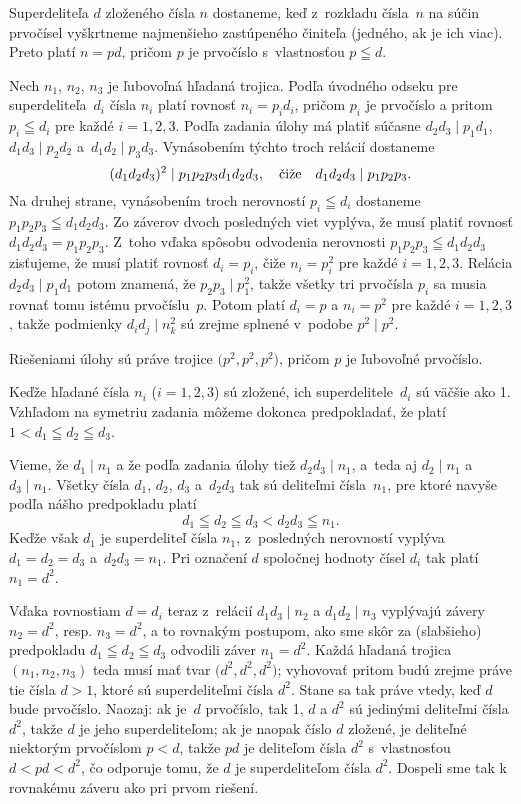 {%
Superdeliteľa $d$ zloženého čísla $n$ dostaneme,
keď z~rozkladu čísla~$n$ na súčin prvočísel vyškrtneme najmenšieho
zastúpeného činiteľa (jedného, ak je ich viac).
Preto platí $n=pd$, pričom $p$ je prvočíslo
s~vlastnosťou $p\leqq d$.

Nech $n_1$, $n_2$, $n_3$ je ľubovoľná hľadaná trojica. Podľa úvodného odseku pre superdeliteľa~$d_i$ čísla $n_i$ platí
rovnosť $n_i=p_id_i$, pričom $p_i$ je prvočíslo a pritom $p_i\leqq d_i$
pre každé $i=1,2,3$. Podľa zadania
úlohy má platiť súčasne $d_2d_3\mid p_1d_1$, $d_1d_3\mid p_2d_2$ a~$d_1d_2\mid p_3d_3$. Vynásobením týchto troch relácií dostaneme
$$
(d_1d_2d_3)^2\mid p_1p_2p_3d_1d_2d_3,\quad\hbox{čiže}\quad
d_1d_2d_3\mid p_1p_2p_3.
$$
Na druhej strane, vynásobením troch nerovností $p_i\leqq d_i$
dostaneme $p_1p_2p_3\leqq d_1d_2d_3$. Zo záverov dvoch
posledných viet vyplýva, že musí platiť rovnosť
$d_1d_2d_3=p_1p_2p_3$. Z~toho vďaka spôsobu odvodenia nerovnosti
$p_1p_2p_3\leqq d_1d_2d_3$ zisťujeme, že musí platiť rovnosť
$d_i=p_i$, čiže $n_i=p_i^2$ pre každé $i=1,2,3$.
Relácia $d_2d_3\mid p_1d_1$ potom znamená, že $p_2p_3\mid p_1^{2}$,
takže všetky tri prvočísla $p_i$ sa musia rovnať tomu istému prvočíslu~$p$.
Potom platí $d_i=p$ a $n_i=p^2$ pre každé $i=1,2,3$, takže podmienky
$d_id_j\mid n_k^2$ sú zrejme splnené v~podobe $p^2\mid p^2$.

\Zav
Riešeniami úlohy sú práve trojice
$\bigl(p^2,p^2,p^2\bigr)$, pričom $p$ je ľubovoľné prvočíslo.

\Jres
Keďže hľadané čísla $n_i$ ($i=1,2,3$) sú zložené, ich
superdelitele~$d_i$ sú väčšie ako 1. Vzhľadom na symetriu zadania
môžeme dokonca predpokladať, že platí $1<d_1\leqq d_2\leqq d_3$.

Vieme, že $d_1\mid n_1$ a že podľa zadania úlohy
tiež $d_2d_3\mid n_1$, a~teda aj $d_2\mid n_1$ a~$d_3\mid
n_1$. Všetky čísla $d_1$, $d_2$, $d_3$ a~$d_2d_3$ tak sú
deliteľmi čísla~$n_1$, pre ktoré navyše podľa nášho predpokladu
platí $$
d_1\leqq d_2\leqq d_3<d_2d_3\leqq n_1.
$$
Keďže však $d_1$ je superdeliteľ čísla $n_1$, z~posledných nerovností
vyplýva $d_1=d_2=d_3$ a~$d_2d_3=n_1$. Pri
označení $d$ spoločnej hodnoty čísel $d_i$ tak platí $n_1=d^2$.

Vďaka rovnostiam $d=d_i$ teraz z~relácií $d_1d_3\mid n_2$ a $d_1d_2\mid n_3$
vyplývajú závery $n_2=d^2$, resp. $n_3=d^2$, a to rovnakým postupom,
ako sme skôr za (slabšieho) predpokladu $d_1\leqq d_2\leqq d_3$ odvodili
záver $n_1=d^2$. Každá hľadaná trojica $(n_1,n_2,n_3)$ teda musí
mať tvar $\bigl(d^2,d^2,d^2\bigr)$; vyhovovať pritom budú zrejme práve tie
čísla $d>1$, ktoré sú superdeliteľmi čísla $d^2$. Stane sa tak
práve vtedy, keď $d$ bude prvočíslo. Naozaj: ak je~$d$ prvočíslo, tak
1, $d$ a $d^2$ sú jedinými deliteľmi čísla $d^2$, takže $d$ je
jeho superdeliteľom; ak je naopak číslo $d$ zložené, je deliteľné
niektorým prvočíslom $p<d$, takže $pd$ je deliteľom čísla $d^2$
s~vlastnosťou $d<pd<d^2$, čo odporuje tomu, že $d$ je superdeliteľom
čísla $d^2$. Dospeli sme tak k rovnakému záveru
ako pri prvom riešení.


}
